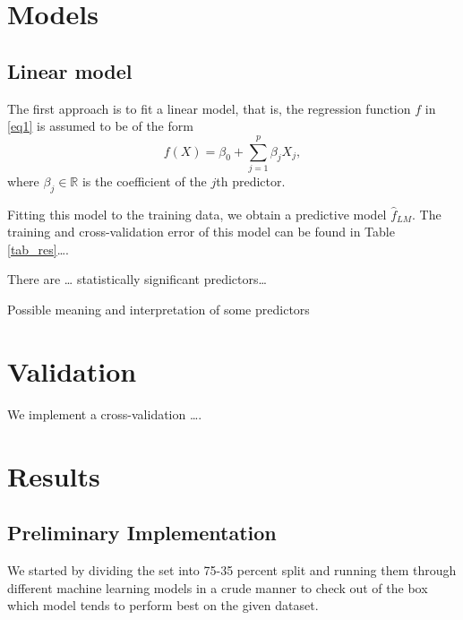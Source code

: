 \documentclass[
]{article}
\begin{document}
\section{Models}

\subsection{Linear model}

The first approach is to fit a linear model, that is, the regression
function \(f\) in \eqref{eq1} is assumed to be of the form \[
  f(X) = \beta_0 + \sum_{j=1}^p \beta_j X_j,
\] where \(\beta_j\in \mathbb R\) is the coefficient of the \(j\)th
predictor.

Fitting this model to the training data, we obtain a predictive model
\(\hat f_{LM}\). The training and cross-validation error of this model
can be found in Table \ref{tab_res}\ldots.

There are \ldots{} statistically significant predictors\ldots{}

Possible meaning and interpretation of some predictors

\section{Validation}

We implement a cross-validation \ldots.

\section{Results}

\subsection{Preliminary Implementation}

We started by dividing the set into 75-35 percent split and running them
through different machine learning models in a crude manner to check out
of the box which model tends to perform best on the given dataset.
\end{document}
